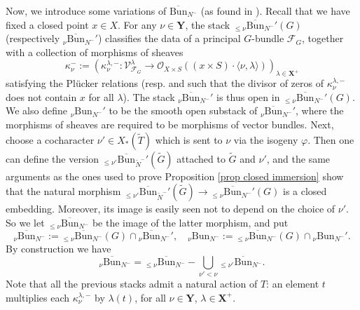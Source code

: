 \documentclass[11pt]{amsart}
\theoremstyle{plain}
\theoremstyle{remark}
\numberwithin{equation}{section}
\begin{document}
	
	Now, we introduce some variations of $\overline{\mathrm{Bun}}_{N^-}$ (as found in \cite[§4.1]{ABBGM}). Recall that we have fixed a closed point $x\in X$. For any $\nu\in \mathbf{Y}$, the stack $_{\leq\nu}\overline{\mathrm{Bun}}_{N^-}'(G)$ (respectively $_{\nu}\overline{\mathrm{Bun}}_{N^-}'$) classifies the data of a principal $G$-bundle $\mathcal{F}_G$, together with a collection of morphisms of sheaves
	$$\kappa_\nu^-:=(\kappa^{\lambda,-}_\nu:\mathcal{V}_{\mathcal{F}_G}^\lambda\to \mathcal{O}_{X\times S}((x\times S)\cdot \langle\nu,\lambda\rangle))_{\lambda\in \mathbf{X}^+} $$
	satisfying the Pl\"ucker relations (resp. and such that the divisor of zeros of $\kappa^{\lambda,-}_\nu$ does not contain $x$ for all $\lambda$). The stack $_{\nu}\overline{\mathrm{Bun}}_{N^-}'$ is thus open in $_{\leq \nu}\overline{\mathrm{Bun}}_{N^-}'(G)$. We also define $_{\nu}\mathrm{Bun}_{N^-}'$ to be the smooth open substack of $_{\nu}\overline{\mathrm{Bun}}_{N^-}'$, where the morphisms of sheaves are required to be morphisms of vector bundles. Next, choose a cocharacter $\nu'\in X_*(\tilde{T})$ which is sent to $\nu$ via the isogeny $\varphi$. Then one can define the version $_{\leq\nu'}\overline{\mathrm{Bun}}_{\tilde{N}^-}'(\tilde{G})$ attached to $\tilde{G}$ and $\nu'$, and the same arguments as the ones used to prove Proposition \ref{prop closed immersion} show that the natural morphism $_{\leq\nu'}\overline{\mathrm{Bun}}_{\tilde{N}^-}'(\tilde{G})\to {_{\leq\nu}\overline{\mathrm{Bun}}_{N^-}'}(G)$ is a closed embedding. Moreover, its image is easily seen not to depend on the choice of $\nu'$. So we let $_{\leq\nu}\overline{\mathrm{Bun}}_{N^-}$ be the image of the latter morphism, and put 
	$$_{\nu}\overline{\mathrm{Bun}}_{N^-}:={_{\leq\nu}\overline{\mathrm{Bun}}_{N^-}}(G)\cap {_{\nu}\overline{\mathrm{Bun}}_{N^-}'},\quad _{\nu}\mathrm{Bun}_{N^-}:={_{\leq\nu}\overline{\mathrm{Bun}}_{N^-}}(G)\cap{_{\nu}\mathrm{Bun}_{N^-}'}.$$
By construction we have 
\begin{equation}\label{eq strat}
    _{\nu}\overline{\mathrm{Bun}}_{N^-}={_{\leq\nu}\overline{\mathrm{Bun}}_{N^-}}-\bigcup_{\nu'<\nu}{_{\leq\nu'}\overline{\mathrm{Bun}}_{N^-}}.
\end{equation}
Note that all the previous stacks admit a natural action of $T$: an element $t$ multiplies each $\kappa_\nu^{\lambda,-}$ by $\lambda(t)$, for all $\nu\in\mathbf{Y}$, $\lambda\in\mathbf{X}^+$.
\end{document}
